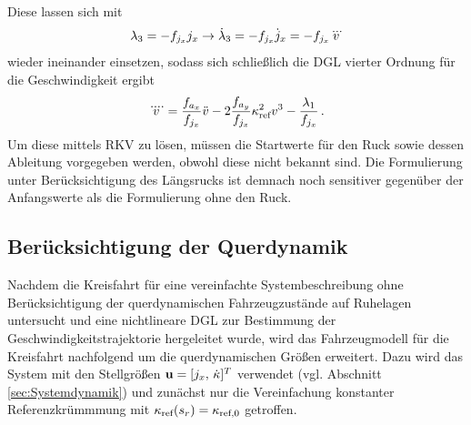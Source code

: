Diese lassen sich mit 
\begin{equation}
\lambda_3 = -f_{j_x} j_x \rightarrow \dot{\lambda}_3 = -f_{j_x} \dot{j}_x = -f_{j_x} \dddot{v}
\end{equation}
wieder ineinander einsetzen, sodass sich schließlich die \gls{DGL} vierter Ordnung für die Geschwindigkeit ergibt
\begin{equation}
\ddddot{v} = \frac{f_{a_x}}{f_{j_x}}\ddot{v} - 2\frac{f_{a_y}}{f_{j_x}}\kappa_{\textrm{ref}}^2v^3 - \frac{\lambda_1}{f_{j_x}}\,. \label{eq:DGL_v_Kreisfahrt_vierte_ordnung}
\end{equation}
Um diese mittels \gls{RKV} zu lösen, müssen die Startwerte für den Ruck sowie dessen Ableitung vorgegeben werden, obwohl diese nicht bekannt sind. Die Formulierung unter Berücksichtigung des Längsrucks ist demnach noch sensitiver gegenüber der Anfangswerte als die Formulierung ohne den Ruck.

\subsection{Berücksichtigung der Querdynamik}
Nachdem die Kreisfahrt für eine vereinfachte Systembeschreibung ohne Berücksichtigung der querdynamischen Fahrzeugzustände auf Ruhelagen untersucht und eine nichtlineare \gls{DGL} zur Bestimmung der Geschwindigkeitstrajektorie hergeleitet wurde, wird das Fahrzeugmodell für die Kreisfahrt nachfolgend um die querdynamischen Größen erweitert. Dazu wird das System mit den Stellgrößen $\boldsymbol{\mathrm{u}} = [j_x,\,\dot{\kappa}]^T$ verwendet (vgl. Abschnitt \ref{sec:Systemdynamik}) und zunächst nur die Vereinfachung konstanter Referenzkrümmmung mit $\kappa_{\textrm{ref}}(s_r)=\kappa_{\textrm{ref},0}$ getroffen. 

